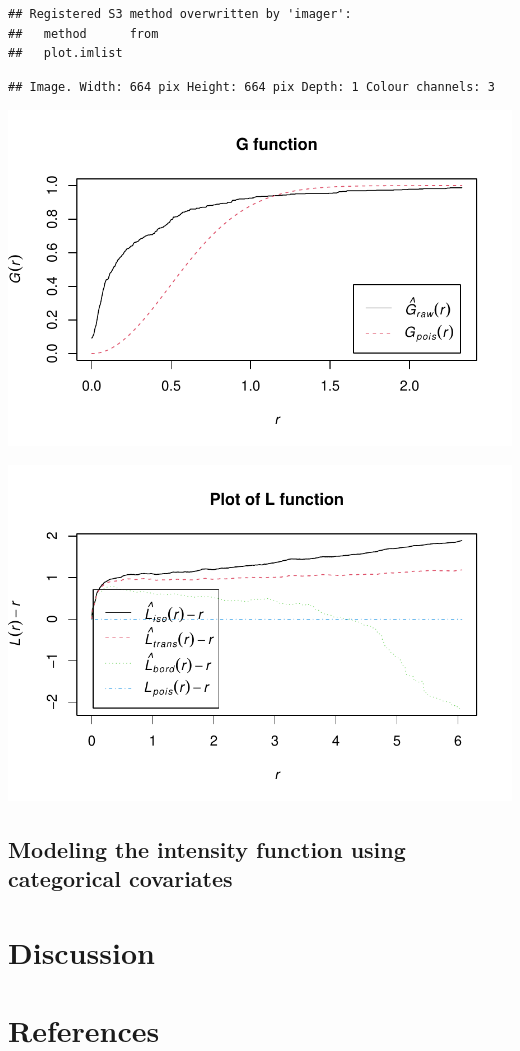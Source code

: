 \documentclass[12pt]{article}
\begin{document}
\begin{verbatim}
## Registered S3 method overwritten by 'imager':
##   method      from
##   plot.imlist
\end{verbatim}

\begin{verbatim}
## Image. Width: 664 pix Height: 664 pix Depth: 1 Colour channels: 3
\end{verbatim}

\includegraphics{JStevenRaquel_STATS295_Final_files/figure-latex/G-function-1.pdf}

\includegraphics{JStevenRaquel_STATS295_Final_files/figure-latex/KL-functions-1.pdf}

\hypertarget{modeling-the-intensity-function-using-categorical-covariates}{%
\subsection{Modeling the intensity function using categorical covariates}\label{modeling-the-intensity-function-using-categorical-covariates}}

\hypertarget{discussion}{%
\section{Discussion}\label{discussion}}

\newpage

\hypertarget{references}{%
\section{References}\label{references}}

\newpage



\end{document}
